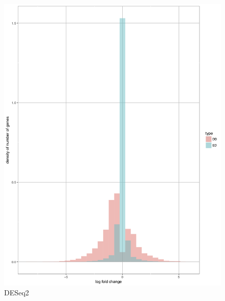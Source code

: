 \documentclass[11pt]{amsart}
\begin{document}
\begin{figure}[H]
  \includegraphics[width=\linewidth]{G45719_des.png}
  \caption{DESeq2}\label{fig:DESeq2}
\endminipage
\end{figure}
\end{document}
